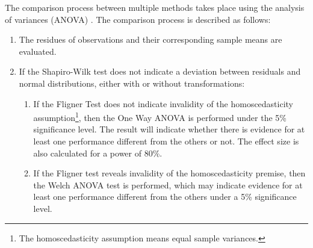 				The comparison process between multiple methods takes place using the analysis of variances (ANOVA) \citep{montgomery2010applied}. The comparison process is described as follows:
				\begin{enumerate}
					\item The residues of observations and their corresponding sample means are evaluated.
					\item If the Shapiro-Wilk test does not indicate a deviation between residuals and normal distributions, either with or without transformations:
					\begin{enumerate}
						\item If the Fligner Test does not indicate invalidity of the homoscedasticity assumption\footnote{The homoscedasticity assumption means equal sample variances.}, then the One Way ANOVA is performed under the 5\% significance level. The result will indicate whether there is evidence for at least one performance different from the others or not. The effect size is also calculated for a power of 80\%.
						\item If the Fligner test reveals invalidity of the homoscedasticity premise, then the Welch ANOVA test is performed, which may indicate evidence for at least one performance different from the others under a 5\% significance level.

\end{enumerate}
\end{enumerate}
